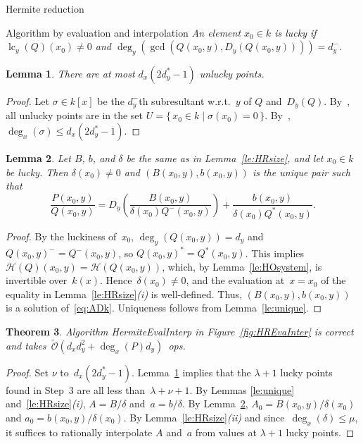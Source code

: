\documentclass{sig-alt-full}
\newcommand{\bigOsoft}{\tilde{\mathcal{O}}}
\newcommand{\lc}{\operatorname{lc}}
\newcommand{\HO}{\mathcal H}
\newtheorem{lemma}{Lemma}
\newtheorem{theorem}[lemma]{Theorem}
\begin{document}
\begin{section}{Hermite reduction}
\begin{subsection}{Algorithm by evaluation and interpolation}
\medskip{}
\emph{An element $x_0\in k$ is \emph{lucky\/} if\/
$\lc_y(Q)(x_0)\neq 0$ and $\deg_y(\gcd(Q(x_0, y), D_y(Q(x_0,
y))))=d_y^-$.}
\begin{lemma}\label{le:unlucky}
There are at most $d_x(2d_y^*-1)$ unlucky points.
\end{lemma}
\begin{proof}
Let $\sigma\in k[x]$ be the $d_y^-$th subresultant w.r.t.\ $y$ of $Q$
and~$D_y(Q)$.
By~\cite[Corollary 5.5]{Gerhard2004}, all
unlucky points are in the set $U=\{\,x_0\in k \mid \sigma(x_0)=0\,\}$.
By~\cite[Corollary 3.2\emph{(ii)}]{Gerhard2004}, $\deg_x(\sigma)\le
d_x(2d_y^*-1)$.
\end{proof}
\begin{lemma}\label{le:commutative}
Let $B$, $b$, and $\delta$ be the same
as in Lemma~\ref{le:HRsize}, and let $x_0\in k$ be lucky.
Then $\delta(x_0)\neq 0$ and $(B(x_0, y), b(x_0, y))$
is the unique pair such that
\begin{equation}\label{eq:ADk}
\frac{P(x_0, y)}{Q(x_0, y)} =
D_y\left(\frac{B(x_0, y)}{\delta(x_0)Q^-(x_0, y)}\right) +
\frac{b(x_0, y)}{\delta(x_0) Q^*(x_0, y)}.
\end{equation}
\end{lemma}
\begin{proof}
By the luckiness of~$x_0$, $\deg_y (Q(x_0, y)) = d_y$ and
$Q(x_0,y)^-=Q^-(x_0,y)$, so $Q(x_0, y)^*=Q^*(x_0,y)$.
This implies $\HO(Q)(x_0,y)=\HO(Q(x_0,y))$, which, by
Lemma~\ref{le:HOsystem}, is invertible over~$k(x)$.
Hence~$\delta(x_0) \neq 0$,
and the evaluation at~$x=x_0$ of the equality in
Lemma~\ref{le:HRsize}\emph{(i)\/} is well-defined.
Thus, $(B(x_0, y), b(x_0, y))$ is a solution of~\eqref{eq:ADk}.
Uniqueness follows from Lemma~\ref{le:unique}.
\end{proof}
\begin{theorem}\label{th:BHR}
Algorithm \textsf{HermiteEvalInterp} in Figure~\ref{fig:HREvaInter} is
correct and takes~$\bigOsoft(d_xd_y^2+\deg_x(P)d_y)$~ops.
\end{theorem}
\begin{proof}
Set $\nu$ to~$d_x(2d_y^*-1)$. Lemma~\ref{le:unlucky} implies that
the $\lambda+1$ lucky points found in Step~3 are all less
than~$\lambda+\nu+1$.
By Lemmas \ref{le:unique} and~\ref{le:HRsize}\emph{(i)}, $A=B/\delta$
and~$a=b/\delta$.
By Lemma~\ref{le:commutative}, $A_0=B(x_0,y)/\delta(x_0)$ and
$a_0=b(x_0,y)/\delta(x_0)$.
By Lemma~\ref{le:HRsize}\emph{(ii)\/} and
since~$\deg_x(\delta)\leq\mu$, it suffices to rationally interpolate
$A$ and~$a$ from values at $\lambda+1$ lucky points.

\end{proof}
\end{subsection}
\end{section}
\end{document}
